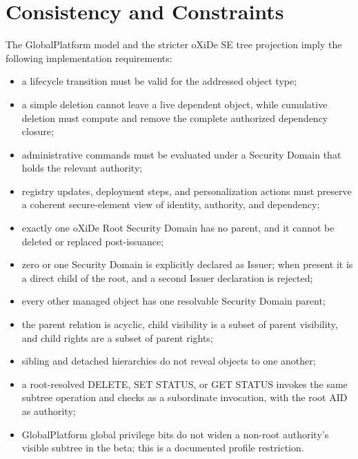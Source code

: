 \section{Consistency and Constraints}
\label{sec:gp-consistency}


The GlobalPlatform model and the stricter oXiDe SE tree projection imply the
following implementation requirements:

\begin{itemize}
\item a lifecycle transition must be valid for the addressed object type;
\item a simple deletion cannot leave a live dependent object, while cumulative
  deletion must compute and remove the complete authorized dependency closure;
\item administrative commands must be evaluated under a Security Domain
  that holds the relevant authority;
\item registry updates, deployment steps, and personalization actions
  must preserve a coherent secure-element view of identity, authority, and
  dependency;
\item exactly one oXiDe Root Security Domain has no parent, and it cannot be
  deleted or replaced post-issuance;
\item zero or one Security Domain is explicitly declared as Issuer; when
  present it is a direct child of the root, and a second Issuer declaration is
  rejected;
\item every other managed object has one resolvable Security Domain parent;
\item the parent relation is acyclic, child visibility is a subset of parent
  visibility, and child rights are a subset of parent rights;
\item sibling and detached hierarchies do not reveal objects to one another;
\item a root-resolved DELETE, SET STATUS, or GET STATUS invokes the same
  subtree operation and checks as a subordinate invocation, with the root AID
  as authority;
\item GlobalPlatform global privilege bits do not widen a non-root authority's
  visible subtree in the beta; this is a documented profile restriction.
\end{itemize}

